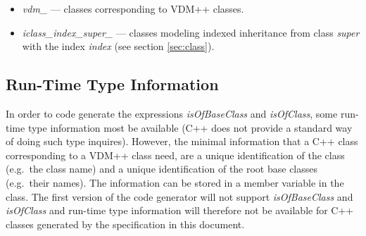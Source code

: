 \documentclass[a4paper,dvips]{article}
\begin{document}
\begin{itemize}
\item {\em vdm\_\/} --- classes corresponding to VDM++ classes.

\item {\em iclass\_index\_super\_\/} --- classes modeling indexed
  inheritance from class {\em super\/} with the index {\em index\/}
  (see section \ref{sec:class}).

\end{itemize}


%
%
%
%
%
%

\subsection{Run-Time Type Information}

In order to code generate the expressions {\em isOfBaseClass} and {\em
  isOfClass}, some run-time type information most be available (C++
does not provide a standard way of doing such type inquires). However,
the minimal information that a C++ class corresponding to a VDM++
class need, are a unique identification of the class (e.g.\ the class
name) and a unique identification of the root base classes (e.g.\ 
their names). The information can be stored in a member
variable in the class. The first version of the code generator will
not support {\em isOfBaseClass} and {\em isOfClass} and run-time type
information will therefore not be available for C++ classes generated
by the specification in this document.
\end{document}
